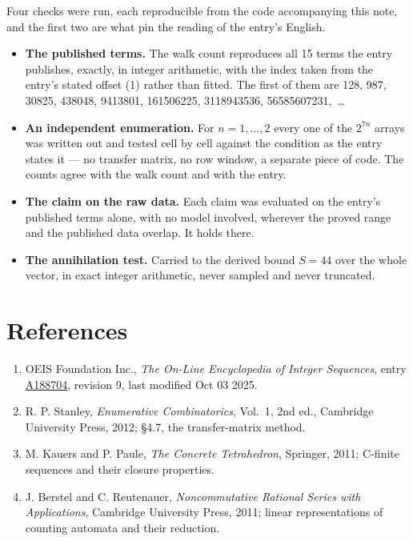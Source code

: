 \documentclass[11pt]{article}
\theoremstyle{definition}
\begin{document}
Four checks were run, each reproducible from the code accompanying this note, and the first two are what pin the reading of the entry's English.

\begin{itemize}

\item {\bfseries The published terms.} The walk count reproduces all 15 terms the entry publishes, exactly, in integer arithmetic, with the index taken from the entry's stated offset (1) rather than fitted. The first of them are 128, 987, 30825, 438048, 9413801, 161506225, 3118943536, 56585607231,~\dots

\item {\bfseries An independent enumeration.} For $n = 1,\dots,2$ every one of the $2^{7n}$ arrays was written out and tested cell by cell against the condition as the entry states it --- no transfer matrix, no row window, a separate piece of code. The counts agree with the walk count and with the entry.

\item {\bfseries The claim on the raw data.} Each claim was evaluated on the entry's published terms alone, with no model involved, wherever the proved range and the published data overlap. It holds there.

\item {\bfseries The annihilation test.} Carried to the derived bound $S = 44$ over the whole vector, in exact integer arithmetic, never sampled and never truncated.

\end{itemize}

\section{References}

\begin{enumerate}

\item OEIS Foundation Inc., \emph{The On-Line Encyclopedia of Integer Sequences}, entry \href{https://oeis.org/A188704}{A188704}, revision 9, last modified Oct 03 2025.

\item R. P. Stanley, \emph{Enumerative Combinatorics}, Vol.~1, 2nd ed., Cambridge University Press, 2012; \S4.7, the transfer-matrix method.

\item M. Kauers and P. Paule, \emph{The Concrete Tetrahedron}, Springer, 2011; C-finite sequences and their closure properties.

\item J. Berstel and C. Reutenauer, \emph{Noncommutative Rational Series with Applications}, Cambridge University Press, 2011; linear representations of counting automata and their reduction.

\end{enumerate}
\end{document}
